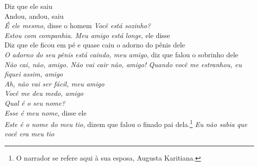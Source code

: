 \bigskip

\begin{linenumbers}\begingroup\raggedright
 
\noindent   Diz que ele saiu\\
  Andou, andou, saiu\\
  \emph{É ele mesmo}, disse o homem \emph{Você está sozinho?}\\
  \emph{Estou com companhia. Meu amigo está longe}, ele disse\\
  Diz que ele ficou em pé e quase caiu o adorno do pênis dele\\
  \emph{O adorno do seu pênis está caindo, meu amigo}, diz que falou o sobrinho dele\\
  \emph{Não cai, não, amigo. Não vai cair não, amigo! Quando você me
 estranhou, eu fiquei assim, amigo}\\
  \emph{Ah, não vai ser fácil, meu amigo}\\
  \emph{Você me deu medo, amigo}\\
  \emph{Qual é o seu nome?}\\
  \emph{Esse é meu nome}, disse ele\\
  \emph{Este é o nome do meu tio}, dizem que falou o finado pai
 dela.\footnote{O narrador se refere aqui à sua esposa, Augusta Karitiana.}
 \emph{Eu não sabia que você era meu tio}
 
\end{linenumbers}\endgroup

\bigskip


